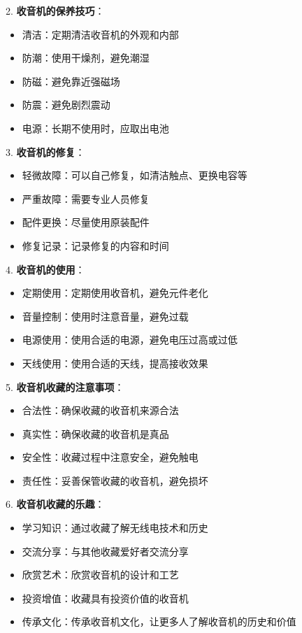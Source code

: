 \documentclass[12pt,UTF8]{ctexbook}
\begin{document}
2. \textbf{收音机的保养技巧}：
   \begin{itemize}[leftmargin=3.5em]
   \item 清洁：定期清洁收音机的外观和内部
   \item 防潮：使用干燥剂，避免潮湿
   \item 防磁：避免靠近强磁场
   \item 防震：避免剧烈震动
   \item 电源：长期不使用时，应取出电池
   \end{itemize}

3. \textbf{收音机的修复}：
   \begin{itemize}[leftmargin=3.5em]
   \item 轻微故障：可以自己修复，如清洁触点、更换电容等
   \item 严重故障：需要专业人员修复
   \item 配件更换：尽量使用原装配件
   \item 修复记录：记录修复的内容和时间
   \end{itemize}

4. \textbf{收音机的使用}：
   \begin{itemize}[leftmargin=3.5em]
   \item 定期使用：定期使用收音机，避免元件老化
   \item 音量控制：使用时注意音量，避免过载
   \item 电源使用：使用合适的电源，避免电压过高或过低
   \item 天线使用：使用合适的天线，提高接收效果
   \end{itemize}

5. \textbf{收音机收藏的注意事项}：
   \begin{itemize}[leftmargin=3.5em]
   \item 合法性：确保收藏的收音机来源合法
   \item 真实性：确保收藏的收音机是真品
   \item 安全性：收藏过程中注意安全，避免触电
   \item 责任性：妥善保管收藏的收音机，避免损坏
   \end{itemize}

6. \textbf{收音机收藏的乐趣}：
   \begin{itemize}[leftmargin=3.5em]
   \item 学习知识：通过收藏了解无线电技术和历史
   \item 交流分享：与其他收藏爱好者交流分享
   \item 欣赏艺术：欣赏收音机的设计和工艺
   \item 投资增值：收藏具有投资价值的收音机
   \item 传承文化：传承收音机文化，让更多人了解收音机的历史和价值
   \end{itemize}
\end{document}
